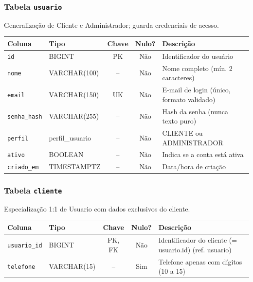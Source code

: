 \subsubsection{Tabela \texttt{usuario}}
\noindent Generalização de Cliente e Administrador; guarda credenciais de acesso.\par\smallskip
\begingroup\footnotesize\renewcommand{\arraystretch}{1.2}
\begin{longtable}{|p{3.0cm}|p{2.6cm}|c|c|p{5.6cm}|}
\hline
\rowcolor{gray!40}\textbf{Coluna} & \textbf{Tipo} & \textbf{Chave} & \textbf{Nulo?} & \textbf{Descrição} \\ \hline
\endhead
\texttt{id} & BIGINT & PK & Não & Identificador do usuário \\ \hline
\texttt{nome} & VARCHAR(100) & -- & Não & Nome completo (mín. 2 caracteres) \\ \hline
\texttt{email} & VARCHAR(150) & UK & Não & E-mail de login (único, formato validado) \\ \hline
\texttt{senha\_hash} & VARCHAR(255) & -- & Não & Hash da senha (nunca texto puro) \\ \hline
\texttt{perfil} & perfil\_usuario & -- & Não & CLIENTE ou ADMINISTRADOR \\ \hline
\texttt{ativo} & BOOLEAN & -- & Não & Indica se a conta está ativa \\ \hline
\texttt{criado\_em} & TIMESTAMPTZ & -- & Não & Data/hora de criação \\ \hline
\end{longtable}
\endgroup
\subsubsection{Tabela \texttt{cliente}}
\noindent Especialização 1:1 de Usuario com dados exclusivos do cliente.\par\smallskip
\begingroup\footnotesize\renewcommand{\arraystretch}{1.2}
\begin{longtable}{|p{3.0cm}|p{2.6cm}|c|c|p{5.6cm}|}
\hline
\rowcolor{gray!40}\textbf{Coluna} & \textbf{Tipo} & \textbf{Chave} & \textbf{Nulo?} & \textbf{Descrição} \\ \hline
\endhead
\texttt{usuario\_id} & BIGINT & PK, FK & Não & Identificador do cliente (= usuario.id) (ref. usuario) \\ \hline
\texttt{telefone} & VARCHAR(15) & -- & Sim & Telefone apenas com dígitos (10 a 15) \\ \hline
\end{longtable}
\endgroup
